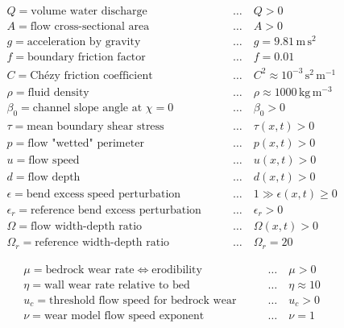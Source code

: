 \documentclass[11pt]{article}
\begin{document}
    \begin{eqnarray}
     &Q  = \text{volume water discharge} 
                       \qquad&\dots\quad Q>0 \\
     &A  = \text{flow cross-sectional area} 
                       \qquad&\dots\quad A>0 \\
     &g  = \text{acceleration by gravity} 
                       \qquad&\dots\quad g = 9.81 \,\mathrm{m}\,\mathrm{s}^2 \\
     &f  = \text{boundary friction factor} 
                       \qquad&\dots\quad f=0.01 \\
     &C  = \text{Chézy friction coefficient} 
                      \qquad&\dots\quad C^2 \approx 10^{-3} \,\mathrm{s}^2\,\mathrm{m}^{-1} \\
     &\rho  = \text{fluid density} 
                       \qquad&\dots\quad \rho \approx 1000 \,\mathrm{kg}\,\mathrm{m}^{-3} \\
     &\beta_0  = \text{channel slope angle at }\chi=0 
                       \qquad&\dots\quad \beta_0 >0 \\
     &\tau  = \text{mean boundary shear stress} 
                       \qquad&\dots\quad \tau(x,t)>0 \\
     &p  = \text{flow "wetted" perimeter} 
                       \qquad&\dots\quad p(x,t)>0 \\
     &u  = \text{flow speed} 
                       \qquad&\dots\quad u(x,t)>0 \\
     &d  = \text{flow depth} 
                       \qquad&\dots\quad d(x,t)>0 \\
     &\epsilon  = \text{bend excess speed perturbation} 
                       \qquad&\dots\quad 1\gg\epsilon(x,t)\geq 0 \\
     &\epsilon_r  = \text{reference bend excess perturbation} 
                       \qquad&\dots\quad \epsilon_r > 0 \\
     &\Omega  = \text{flow width-depth ratio} 
                       \qquad&\dots\quad \Omega(x,t)>0 \\
     &\Omega_r  = \text{reference width-depth ratio} 
                       \qquad&\dots\quad \Omega_r=20
\end{eqnarray}

    \begin{eqnarray}
     &\mu  =  \text{bedrock wear rate}\Leftrightarrow \text{erodibility}  
                       \qquad&\dots\quad \mu>0 \\
     &\eta  = \text{wall wear rate relative to bed} 
                       \qquad&\dots\quad \eta \approx 10 \\
     &u_c  = \text{threshold flow speed for bedrock wear} 
                       \qquad&\dots\quad u_c>0 \\
     &\nu  = \text{wear model flow speed exponent} 
                       \qquad&\dots\quad \nu = 1
\end{eqnarray}
\end{document}
